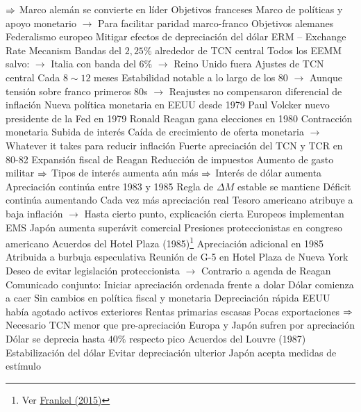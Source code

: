 \documentclass{nuevotema}
\begin{document}
\begin{esquemal}
				\4[] $\then$ Marco alemán se convierte en líder
				\4 Objetivos franceses
				\4[] Marco de políticas y apoyo monetario
				\4[] $\to$ Para facilitar paridad marco-franco
				\4 Objetivos alemanes
				\4[] Federalismo europeo
				\4[] Mitigar efectos de depreciación del dólar
				\4 ERM --  Exchange Rate Mecanism
				\4[] Bandas del $2,25\%$ alrededor de TCN central
				\4[] Todos los EEMM salvo:
				\4[] $\to$ Italia con banda del $6\%$
				\4[] $\to$ Reino Unido fuera
				\4 Ajustes de TCN central
				\4[] Cada $8 \sim 12$ meses
				\4[] Estabilidad notable a lo largo de los 80
				\4[] $\to$ Aunque tensión sobre franco primeros 80s
				\4[] $\to$ Reajustes no compensaron diferencial de inflación
			\3 Nueva política monetaria en EEUU desde 1979
				\4 Paul Volcker nuevo presidente de la Fed en 1979
				\4 Ronald Reagan gana elecciones en 1980
				\4 Contracción monetaria
				\4[] Subida de interés
				\4[] Caída de crecimiento de oferta monetaria
				\4[] $\to$ Whatever it takes para reducir inflación
				\4[$\then$] Fuerte apreciación del TCN y TCR en 80-82
				\4 Expansión fiscal de Reagan
				\4[] Reducción de impuestos
				\4[] Aumento de gasto militar
				\4[] $\then$ Tipos de interés aumenta aún más
				\4[] $\then$ Interés de dólar aumenta
				\4 Apreciación continúa entre 1983 y 1985
				\4[] Regla de $\Delta M$ estable se mantiene
				\4[] Déficit continúa aumentando
				\4[] Cada vez más apreciación real
				\4[] Tesoro americano atribuye a baja inflación
				\4[] $\to$ Hasta cierto punto, explicación cierta
				\4 Europeos implementan EMS
				\4 Japón aumenta superávit comercial
				\4 Presiones proteccionistas en congreso americano
			\3 Acuerdos del Hotel Plaza (1985)\footnote{Ver \href{https://www.nber.org/papers/w21813.pdf}{Frankel (2015)}}
				\4 Apreciación adicional en 1985
				\4[] Atribuida a burbuja especulativa
				\4 Reunión de G-5 en Hotel Plaza de Nueva York
				\4[] Deseo de evitar legislación proteccionista
				\4[] $\to$ Contrario a agenda de Reagan
				\4 Comunicado conjunto:
				\4[] Iniciar apreciación ordenada frente a dolar
				\4[$\then$] Dólar comienza a caer
				\4[$\then$] Sin cambios en política fiscal y monetaria
				\4 Depreciación rápida
				\4[] EEUU había agotado activos exteriores
				\4[] Rentas primarias escasas
				\4[] Pocas exportaciones
				\4[] $\then$ Necesario TCN menor que pre-apreciación
				\4 Europa y Japón sufren por apreciación
				\4[] Dólar se deprecia hasta $40\%$ respecto pico
			\3 Acuerdos del Louvre (1987)
				\4 Estabilización del dólar
				\4[] Evitar depreciación ulterior
				\4 Japón acepta medidas de estímulo

\end{esquemal}
\end{document}
